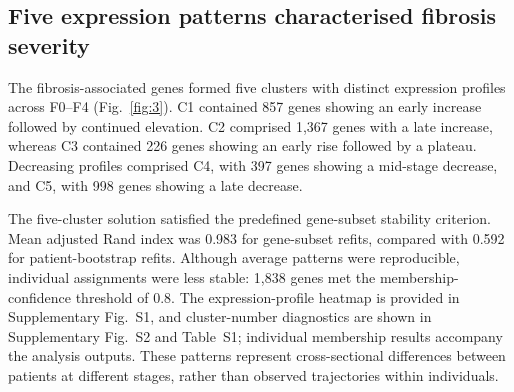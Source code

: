\documentclass[11pt,a4paper]{article}
\begin{document}
\subsection*{Five expression patterns characterised fibrosis severity}

The fibrosis-associated genes formed five clusters with distinct expression profiles across F0–F4 (Fig.~\ref{fig:3}). C1 contained 857 genes showing an early increase followed by continued elevation. C2 comprised 1,367 genes with a late increase, whereas C3 contained 226 genes showing an early rise followed by a plateau. Decreasing profiles comprised C4, with 397 genes showing a mid-stage decrease, and C5, with 998 genes showing a late decrease.

The five-cluster solution satisfied the predefined gene-subset stability criterion. Mean adjusted Rand index was 0.983 for gene-subset refits, compared with 0.592 for patient-bootstrap refits. Although average patterns were reproducible, individual assignments were less stable: 1,838 genes met the membership-confidence threshold of 0.8. The expression-profile heatmap is provided in Supplementary Fig.~S1, and cluster-number diagnostics are shown in Supplementary Fig.~S2 and Table~S1; individual membership results accompany the analysis outputs. These patterns represent cross-sectional differences between patients at different stages, rather than observed trajectories within individuals.
\end{document}
